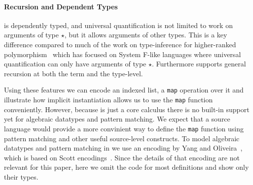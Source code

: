 \paragraph{Recursion and Dependent Types}

\name is dependently typed, and universal quantification is not limited to work
on arguments of type $\star$, but it allows arguments of other types. This is
a key difference compared to much of the work on type-inference for higher-ranked
polymorphism~\cite{dunfield2013complete,le2003ml,leijen2008hmf,vytiniotis2008fph,jones2007practical}
which has focused on System F-like
languages where universal quantification can only have arguments of type $\star$.
Furthermore \name supports general recursion at both the term and the type-level.

Using these features we can encode an indexed list, a \verb|map| operation over it
and illustrate how implicit instantiation allows us to use the \verb|map| function
conveniently.
However, because \name is just a core calculus there is no built-in support
yet for algebraic datatypes and pattern matching.
We expect that a source language would provide a more convinient
way to define the \verb|map| function using pattern matching and other useful source-level
constructs. To model algebraic datatypes and pattern matching in \name we
use an encoding by Yang and Oliveira~\cite{yang2019pure},
which is based on Scott encodings~\cite{mogensen1992efficient}.
Since the details of that encoding are not relevant for this paper,
here we omit the code for most definitions and show only their types.


